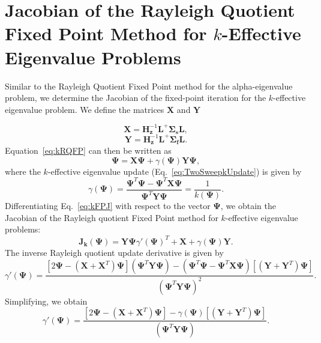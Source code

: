\section{Jacobian of the Rayleigh Quotient Fixed Point Method for $k$-Effective Eigenvalue Problems}

Similar to the Rayleigh Quotient Fixed Point method for the alpha-eigenvalue problem, we determine the Jacobian of the fixed-point iteration for the $k$-effective eigenvalue problem. We define the matrices $\mathbf{X}$ and $\mathbf{Y}$

\begin{equation}
	\mathbf{X} = \mathbf{H}_{\mathbf{z}}^{-1} \mathbf{L}^{+} \mathbf{\Sigma_{s}} \mathbf{L},
\end{equation}
\begin{equation}
	\mathbf{Y} = \mathbf{H}_{\mathbf{z}}^{-1} \mathbf{L}^{+} \mathbf{\Sigma_{f}} \mathbf{L}.
\end{equation}
Equation~\ref{eq:kRQFP} can then be written as
\begin{equation}
	\mathbf{\Psi} = \mathbf{X\Psi} + \gamma(\mathbf{\Psi}) \mathbf{Y\Psi},
	\label{eq:kFPJ}
\end{equation}
where the $k$-effective eigenvalue update (Eq.~\ref{eq:TwoSweepkUpdate}) is given by
\begin{equation}
	\gamma(\mathbf{\Psi}) = \frac{ \mathbf{\Psi}^{T} \mathbf{\Psi} - \mathbf{\Psi}^{T} \mathbf{X} \mathbf{\Psi}}{\mathbf{\Psi}^{T}\mathbf{Y} \mathbf{\Psi}} = \frac{1}{k(\mathbf{\Psi})}.
\end{equation}
Differentiating Eq.~\ref{eq:kFPJ} with respect to the vector $\mathbf{\Psi}$, we obtain the Jacobian of the Rayleigh quotient Fixed Point method for $k$-effective eigenvalue problems:
\begin{equation}
	\mathbf{J_{k}}(\mathbf{\Psi}) = \mathbf{Y\Psi} \gamma'(\mathbf{\Psi})^{T} + \mathbf{X} + \gamma(\mathbf{\Psi}) \mathbf{Y}.
\end{equation}
The inverse Rayleigh quotient update derivative is given by
\begin{equation}
	\gamma'(\mathbf{\Psi}) = \frac{[2 \mathbf{\Psi} - (\mathbf{X} + \mathbf{X}^{T}) \mathbf{\Psi}] (\mathbf{\Psi}^{T}\mathbf{Y} \mathbf{\Psi}) - (\mathbf{\Psi}^{T} \mathbf{\Psi} - \mathbf{\Psi}^{T} \mathbf{X} \mathbf{\Psi})[(\mathbf{Y} + \mathbf{Y}^{T})\mathbf{\Psi}]}{(\mathbf{\Psi}^{T} \mathbf{Y} \mathbf{\Psi})^{2}}.
\end{equation}
Simplifying, we obtain
\begin{equation}
	\gamma'(\mathbf{\Psi}) = \frac{[2 \mathbf{\Psi} - (\mathbf{X} + \mathbf{X}^{T}) \mathbf{\Psi}]  -\gamma(\mathbf{\Psi})[(\mathbf{Y} + \mathbf{Y}^{T})\mathbf{\Psi}]}{(\mathbf{\Psi}^{T} \mathbf{Y} \mathbf{\Psi})}.
\end{equation}
